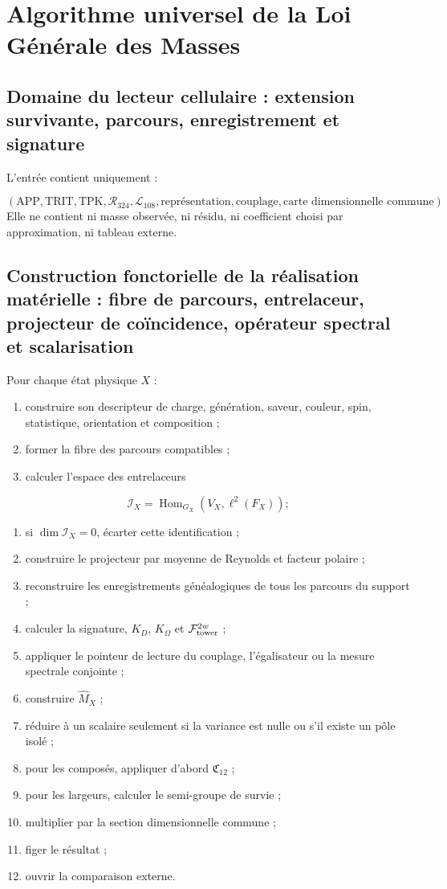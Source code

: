 \section{Algorithme universel de la Loi Générale des Masses}
\subsection{Domaine du lecteur cellulaire : extension survivante, parcours, enregistrement et signature}
L'entrée contient uniquement :

\[
 (\mathrm{APP},\mathrm{TRIT},\mathrm{TPK},
 \mathcal R_{324},\mathcal L_{108},
 \text{représentation},\text{couplage},
 \text{carte dimensionnelle commune}).
\]
Elle ne contient ni masse observée, ni résidu, ni coefficient choisi par approximation, ni tableau externe.

\subsection{Construction fonctorielle de la réalisation matérielle : fibre de parcours, entrelaceur, projecteur de coïncidence, opérateur spectral et scalarisation}
Pour chaque état physique \(X\) :

\begin{enumerate}
\item construire son descripteur de charge, génération, saveur, couleur, spin, statistique,
orientation et composition ;

\item former la fibre des parcours compatibles ;
\item calculer l'espace des entrelaceurs
\end{enumerate}
   \[
   \mathscr I_X=
   \operatorname{Hom}_{G_X}(V_X,\ell^2(F_X));
   \]
\begin{enumerate}
\item si \(\dim\mathscr I_X=0\), écarter cette identification ;
\item construire le projecteur par moyenne de Reynolds et facteur polaire ;
\item reconstruire les enregistrements généalogiques de tous les parcours du support ;
\item calculer la signature, \(K_D\), \(K_\Omega\) et
\(\mathcal F_{\rm tower}^{2w}\) ;

\item appliquer le pointeur de lecture du couplage, l'égalisateur ou la mesure
spectrale conjointe ;

\item construire \(\widehat M_X\) ;
\item réduire à un scalaire seulement si la variance est nulle ou s'il existe un pôle isolé ;
\item pour les composés, appliquer d'abord \(\mathfrak C_{12}\) ;
\item pour les largeurs, calculer le semi-groupe de survie ;
\item multiplier par la section dimensionnelle commune ;
\item figer le résultat ;
\item ouvrir la comparaison externe.
\end{enumerate}
